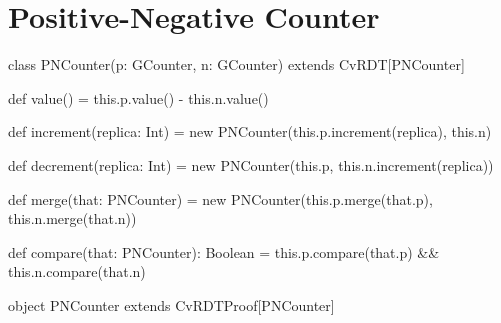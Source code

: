 
%


\chapter{Positive-Negative Counter}
\label{app:positive_negative_counter}

\begin{Scala}
class PNCounter(p: GCounter, n: GCounter) extends CvRDT[PNCounter] {
  def value() = this.p.value() - this.n.value()

  def increment(replica: Int) =
    new PNCounter(this.p.increment(replica), this.n)

  def decrement(replica: Int) =
    new PNCounter(this.p, this.n.increment(replica))

  def merge(that: PNCounter) =
    new PNCounter(this.p.merge(that.p), this.n.merge(that.n))

  def compare(that: PNCounter): Boolean =
    this.p.compare(that.p) && this.n.compare(that.n)
}

object PNCounter extends CvRDTProof[PNCounter]
\end{Scala}

